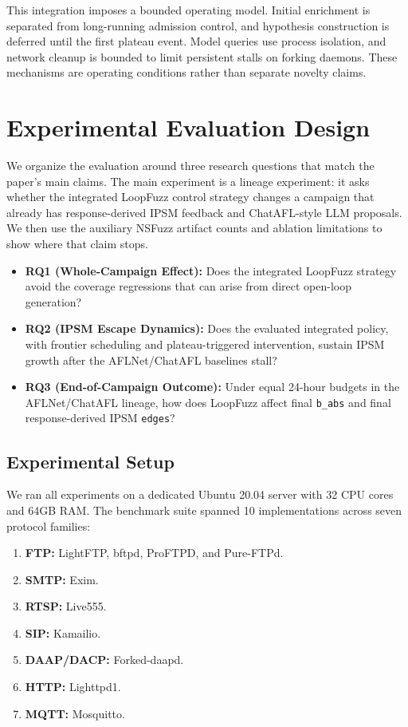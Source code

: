 \documentclass[final,5p,times,number]{elsarticle}
\begin{document}
This integration imposes a bounded operating model. Initial enrichment is separated from long-running admission control, and hypothesis construction is deferred until the first plateau event. Model queries use process isolation, and network cleanup is bounded to limit persistent stalls on forking daemons. These mechanisms are operating conditions rather than separate novelty claims.

\section{Experimental Evaluation Design}

We organize the evaluation around three research questions that match the paper's main claims. The main experiment is a lineage experiment: it asks whether the integrated LoopFuzz control strategy changes a campaign that already has response-derived IPSM feedback and ChatAFL-style LLM proposals. We then use the auxiliary NSFuzz artifact counts and ablation limitations to show where that claim stops.
\begin{itemize}
    \item \textbf{RQ1 (Whole-Campaign Effect):} Does the integrated LoopFuzz strategy avoid the coverage regressions that can arise from direct open-loop generation?
    \item \textbf{RQ2 (IPSM Escape Dynamics):} Does the evaluated integrated policy, with frontier scheduling and plateau-triggered intervention, sustain IPSM growth after the AFLNet/ChatAFL baselines stall?
    \item \textbf{RQ3 (End-of-Campaign Outcome):} Under equal 24-hour budgets in the AFLNet/ChatAFL lineage, how does LoopFuzz affect final \texttt{b\_abs} and final response-derived IPSM \texttt{edges}?
\end{itemize}

\subsection{Experimental Setup}
We ran all experiments on a dedicated Ubuntu 20.04 server with 32 CPU cores and 64GB RAM. The benchmark suite spanned 10 implementations across seven protocol families:
\begin{enumerate}
    \item \textbf{FTP:} LightFTP, bftpd, ProFTPD, and Pure-FTPd.
    \item \textbf{SMTP:} Exim.
    \item \textbf{RTSP:} Live555.
    \item \textbf{SIP:} Kamailio.
    \item \textbf{DAAP/DACP:} Forked-daapd.
    \item \textbf{HTTP:} Lighttpd1.
    \item \textbf{MQTT:} Mosquitto.
\end{enumerate}
\end{document}
